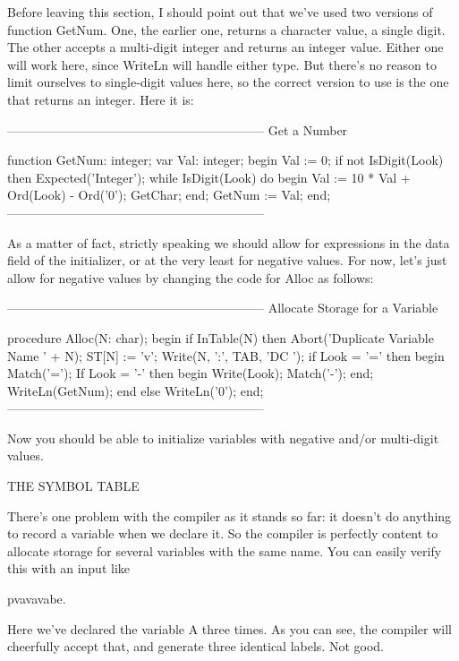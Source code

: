 \documentclass[float=false, crop=false]{standalone}
\begin{document}
Before leaving this section, I should point out that we've used two versions of
function GetNum. One, the earlier one, returns a character value, a single
digit. The other accepts a multi-digit integer and returns an integer value.
Either one will work here, since WriteLn will handle either type. But there's no
reason to limit ourselves to single-digit values here, so the correct version to
use is the one that returns an integer. Here it is:

\begin{code}
{--------------------------------------------------------------}
{ Get a Number }

function GetNum: integer;
var Val: integer;
begin
   Val := 0;
   if not IsDigit(Look) then Expected('Integer');
   while IsDigit(Look) do begin
      Val := 10 * Val + Ord(Look) - Ord('0');
      GetChar;
   end;
   GetNum := Val;
end;
{--------------------------------------------------------------}
\end{code}

As a matter of fact, strictly speaking we should allow for expressions in the
data field of the initializer, or at the very least for negative values. For
now, let's just allow for negative values by changing the code for Alloc as
follows:

\begin{code}
{--------------------------------------------------------------}
{ Allocate Storage for a Variable }

procedure Alloc(N: char);
begin
   if InTable(N) then Abort('Duplicate Variable Name ' + N);
   ST[N] := 'v';
   Write(N, ':', TAB, 'DC ');
   if Look = '=' then begin
      Match('=');
      If Look = '-' then begin
         Write(Look);
         Match('-');
      end;
      WriteLn(GetNum);
      end
   else
      WriteLn('0');
end;
{--------------------------------------------------------------}
\end{code}

Now  you should be able to  initialize  variables  with  negative
and/or multi-digit values.


THE SYMBOL TABLE

There's one problem with the compiler as it stands so far: it doesn't do
anything to record a variable when we declare it. So the compiler is perfectly
content to allocate storage for several variables with the same name. You can
easily verify this with an input like


     pvavavabe.


Here we've declared the variable A three times. As you can see, the compiler
will cheerfully accept that, and generate three identical labels. Not good.
\end{document}
